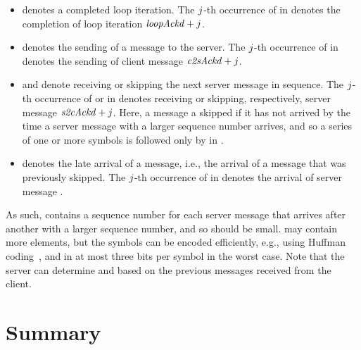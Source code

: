 \begin{itemize}
\item \symbLoop denotes a completed loop iteration.  The $j$-th
occurrence of \symbLoop in \symbSeq{} denotes the completion of loop
iteration $\mathit{loopAckd} + j$.
\item \symbSent denotes the sending of a message to the server.  The
$j$-th occurrence of \symbSent in \symbSeq{} denotes the
sending of client message $\mathit{c2sAckd}+j$.
\item \symbRcvd and \symbSkip denote receiving or skipping the
next server message in sequence.  The $j$-th occurrence of
\symbRcvd or \symbSkip in \symbSeq{} denotes receiving or skipping,
respectively, server message $\mathit{s2cAckd}+j$.  Here, a
message a skipped if it has not arrived by the time a server message
with a larger sequence number arrives, and so a series of one or more
\symbSkip symbols is followed only by \symbRcvd in \symbSeq{}.
\item \symbLate denotes the late arrival of a message, i.e., the
arrival of a message that was previously skipped.  The
$j$-th occurrence of \symbLate in \symbSeq{} denotes the
arrival of server message \lateMsgs{\symbLateCtr}.
\end{itemize}

As such, \lateMsgs{} contains a sequence number for each server
message that arrives after another with a larger sequence number, and
so \lateMsgs{} should be small.  \symbSeq{} may contain more elements,
but the symbols can be encoded efficiently, e.g., using Huffman
coding~\cite{huffman52:codes}, and in at most three bits per symbol in
the worst case.  Note that the server can determine \sToCAckd and
\loopAckd based on the previous messages received from the client.

\section{Summary}
\label{sec:scv:conclusion}


